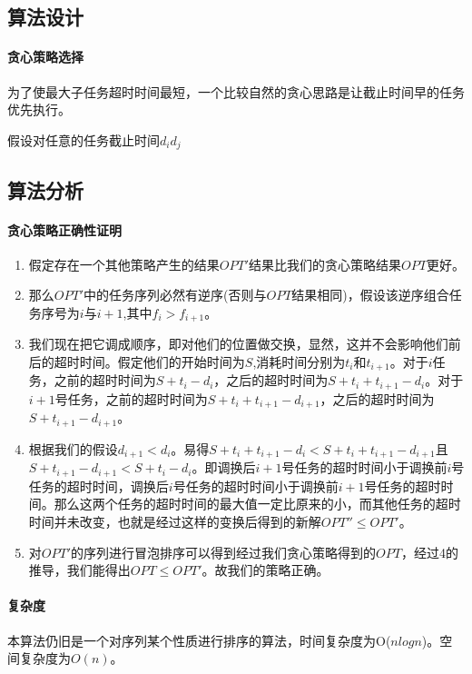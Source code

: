 \subsection{算法设计}
\paragraph*{贪心策略选择}
为了使最大子任务超时时间最短，一个比较自然的贪心思路是让截止时间早的任务优先执行。

\begin{remark}
    假设对任意的任务截止时间$d_i$\neq$d_j$
\end{remark}

\subsection{算法分析}

\paragraph*{贪心策略正确性证明}
\begin{enumerate}
    \item 假定存在一个其他策略产生的结果$OPT'$结果比我们的贪心策略结果$OPT$更好。
    \item 那么$OPT'$中的任务序列必然有逆序(否则与$OPT$结果相同)，假设该逆序组合任务序号为$i$与$i+1$,其中$f_i>f_{i+1}$。
    \item 我们现在把它调成顺序，即对他们的位置做交换，显然，这并不会影响他们前后的超时时间。假定他们的开始时间为$S$,消耗时间分别为$t_i$和$t_{i+1}$。对于$i$任务，之前的超时时间为$S+t_i-d_i$，之后的超时时间为$S+t_i+t_{i+1}-d_i$。对于$i+1$号任务，之前的超时时间为$S+t_i+t_{i+1}-d_{i+1}$，之后的超时时间为$S+t_{i+1}-d_{i+1}$。
    \item 根据我们的假设$d_{i+1}<d_i$。易得$S+t_i+t_{i+1}-d_i<S+t_i+t_{i+1}-d_{i+1}$且$S+t_{i+1}-d_{i+1}<S+t_i-d_i$。即调换后$i+1$号任务的超时时间小于调换前$i$号任务的超时时间，调换后$i$号任务的超时时间小于调换前$i+1$号任务的超时时间。那么这两个任务的超时时间的最大值一定比原来的小，而其他任务的超时时间并未改变，也就是经过这样的变换后得到的新解$OPT'' \leq OPT'$。
    \item 对$OPT'$的序列进行冒泡排序可以得到经过我们贪心策略得到的$OPT$，经过4的推导，我们能得出$OPT \leq OPT'$。故我们的策略正确。
\end{enumerate}

\paragraph*{复杂度}
本算法仍旧是一个对序列某个性质进行排序的算法，时间复杂度为O($nlogn$)。空间复杂度为$O(n)$。

